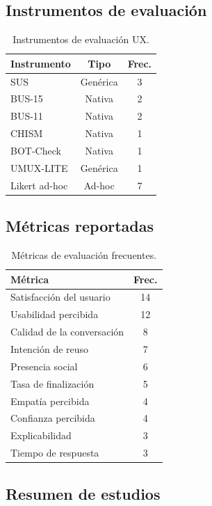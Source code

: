 \documentclass[11pt,twocolumn]{article}
\begin{document}
\subsection{Instrumentos de evaluación}

\begin{table}[H]
\centering
\caption{Instrumentos de evaluación UX.}
\label{tab:instrumentos}
\begin{tabular}{@{}lcc@{}}
\toprule
\textbf{Instrumento} & \textbf{Tipo} & \textbf{Frec.} \\
\midrule
SUS & Genérica & 3 \\
BUS-15 & Nativa & 2 \\
BUS-11 & Nativa & 2 \\
CHISM & Nativa & 1 \\
BOT-Check & Nativa & 1 \\
UMUX-LITE & Genérica & 1 \\
Likert ad-hoc & Ad-hoc & 7 \\
\bottomrule
\end{tabular}
\end{table}

\subsection{Métricas reportadas}

\begin{table}[H]
\centering
\caption{Métricas de evaluación frecuentes.}
\label{tab:metricas}
\begin{tabular}{@{}lc@{}}
\toprule
\textbf{Métrica} & \textbf{Frec.} \\
\midrule
Satisfacción del usuario & 14 \\
Usabilidad percibida & 12 \\
Calidad de la conversación & 8 \\
Intención de reuso & 7 \\
Presencia social & 6 \\
Tasa de finalización & 5 \\
Empatía percibida & 4 \\
Confianza percibida & 4 \\
Explicabilidad & 3 \\
Tiempo de respuesta & 3 \\
\bottomrule
\end{tabular}
\end{table}

\subsection{Resumen de estudios}
\end{document}
